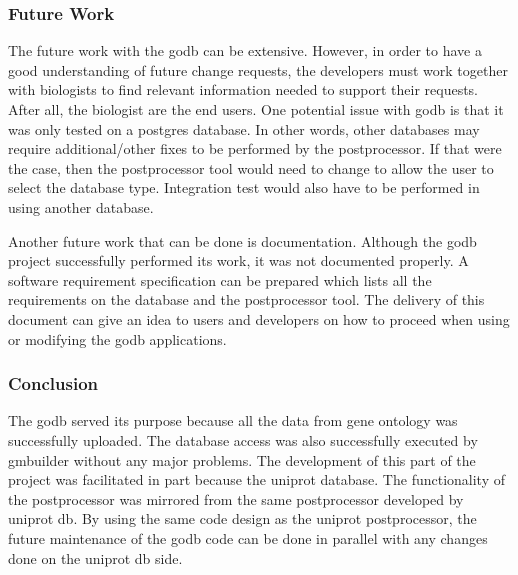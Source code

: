 \subsubsection{Future Work}
The future work with the godb can be extensive.  However, in order to have a good understanding of
future change requests, the developers must work together with biologists to find relevant information needed to support their requests.
After all, the biologist are the end users. One potential issue with  godb is that it was only tested on a postgres database. In other
words, other databases may require additional/other fixes to be performed by the postprocessor. If that were the case, then
the postprocessor tool would need to change to allow the user to select the database type. Integration test would also have to be performed
in using another database.

Another future work that can be done is
documentation.  Although the godb project successfully performed its work, it was not documented properly.  A software
requirement specification can be prepared which lists all the requirements on the database and the postprocessor tool.  The
delivery of this document can give an idea to users and developers on how to proceed when using or modifying the godb
applications.

\subsubsection{Conclusion}
The godb served its purpose because all the data from gene ontology was successfully uploaded.  The database access was also
successfully executed by gmbuilder without any major problems.  The development of this part of the project was facilitated
in part because the uniprot database.  The functionality of the postprocessor was mirrored from the same postprocessor
developed by uniprot db.  By using the same code design as the uniprot postprocessor, the future maintenance of the godb
code can be done in parallel with any changes done on the uniprot db side.

%
